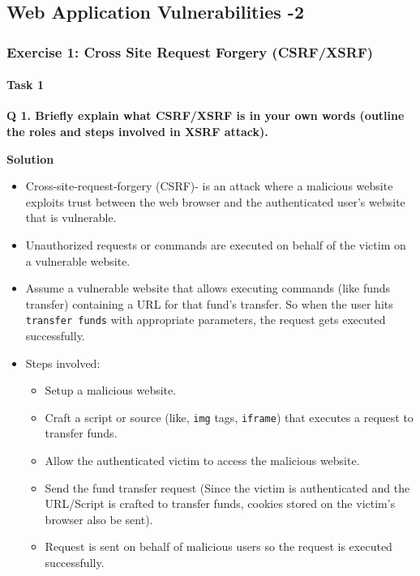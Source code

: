 \hypertarget{web-application-vulnerabilities--2}{%
\subsection{Web Application Vulnerabilities
-2}\label{web-application-vulnerabilities--2}}

\hypertarget{exercise-1-cross-site-request-forgery-csrfxsrf}{%
\subsubsection{Exercise 1: Cross Site Request Forgery
(CSRF/XSRF)}\label{exercise-1-cross-site-request-forgery-csrfxsrf}}

\hypertarget{task-1}{%
\paragraph{Task 1}\label{task-1}}

\textbf{Q 1. Briefly explain what CSRF/XSRF is in your own words
(outline the roles and steps involved in XSRF attack).}

\textbf{Solution}

\begin{itemize}
\item
  Cross-site-request-forgery (CSRF)- is an attack where a malicious
  website exploits trust between the web browser and the authenticated
  user's website that is vulnerable.
\item
  Unauthorized requests or commands are executed on behalf of the victim
  on a vulnerable website.
\item
  Assume a vulnerable website that allows executing commands (like funds
  transfer) containing a URL for that fund's transfer. So when the user
  hits \texttt{transfer\ funds} with appropriate parameters, the request
  gets executed successfully.
\item
  Steps involved:

  \begin{itemize}
  \tightlist
  \item
    Setup a malicious website.
  \item
    Craft a script or source (like, \texttt{img} tags, \texttt{iframe})
    that executes a request to transfer funds.
  \item
    Allow the authenticated victim to access the malicious website.
  \item
    Send the fund transfer request (Since the victim is authenticated
    and the URL/Script is crafted to transfer funds, cookies stored on
    the victim's browser also be sent).
  \item
    Request is sent on behalf of malicious users so the request is
    executed successfully.
  \end{itemize}
\end{itemize}

